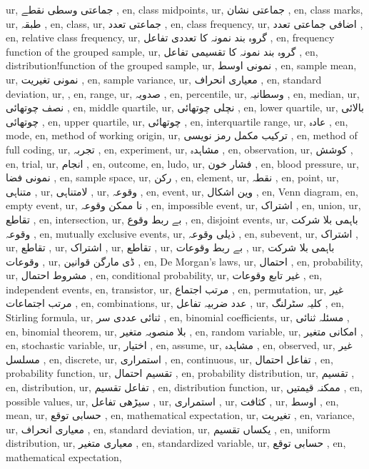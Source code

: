 ur, جماعتی وسطی نقطے ,
en, class midpoints,
ur, جماعتی نشان ,
en, class marks,
ur, طبقہ ,
en, class,
ur, جماعتی تعدد ,
en, class frequency,
ur, اضافی جماعتی تعدد ,
en, relative class frequency,
ur, گروہ بند نمونہ کا تعددی تفاعل ,
en, frequency function of the grouped sample,
ur, گروہ بند نمونہ کا تقسیمی تفاعل ,
en, distribution!function of the grouped sample,
ur, نمونی اوسط ,
en, sample mean,
ur, نمونی تغیریت ,
en, sample variance,
ur, معیاری انحراف ,
en, standard deviation,
ur,  ,
en, range,
ur, صدویہ ,
en, percentile,
ur, وسطانیہ ,
en, median,
ur, نصف چوتھائی ,
en, middle quartile,
ur, نچلی چوتھائی ,
en, lower quartile,
ur, بالائی چوتھائی ,
en, upper quartile,
ur, چوتھائی  ,
en, interquartile range,
ur, عادہ ,
en, mode,
en, method of working origin,
ur, ترکیب مکمل رمز نویسی ,
en, method of full coding,
ur, تجربہ ,
en, experiment,
ur, مشاہدہ ,
en, observation,
ur, کوشش ,
en, trial,
ur, انجام ,
en, outcome,
en, ludo,
ur, فشار خون ,
en, blood pressure,
ur, نمونی فضا ,
en, sample space,
ur, رکن ,
en, element,
ur, نقطہ ,
en, point,
ur, متناہی ,
ur, لامتناہی ,
ur, وقوعہ ,
en, event,
ur, وین اشکال ,
en, Venn diagram,
en, empty event,
ur, نا ممکن وقوعہ ,
en, impossible event,
ur, اشتراک ,
en, union,
ur, تقاطع ,
en, intersection,
ur, بے ربط وقوع ,
en, disjoint events,
ur, باہمی بلا شرکت وقوعہ ,
en, mutually exclusive events,
ur, ذیلی وقوعہ ,
en, subevent,
ur, اشتراک ,
ur, تقاطع ,
ur, اشتراک ,
ur, تقاطع ,
ur, بے ربط وقوعات ,
ur, باہمی بلا شرکت وقوعات ,
ur, ڈی مارگن قوانین ,
en, De Morgan's laws,
ur, احتمال ,
en, probability,
ur, مشروط احتمال ,
en, conditional probability,
ur, غیر تابع وقوعات ,
en, independent events,
en, transistor,
ur, مرتب اجتماع ,
en, permutation,
ur, غیر مرتب اجتماعات ,
en, combinations,
ur, عدد ضربیہ تفاعل ,
ur, کلیہ سٹرلنگ ,
en, Stirling formula,
ur, ثنائی عددی سر ,
en, binomial coefficients,
ur, مسئلہ ثنائی ,
en, binomial theorem,
ur, بلا منصوبہ متغیر ,
en, random variable,
ur, امکانی متغیر ,
en, stochastic variable,
ur, اختیار ,
en, assume,
ur, مشاہدہ ,
en, observed,
ur, غیر مسلسل ,
en, discrete,
ur, استمراری ,
en, continuous,
ur, تفاعل احتمال ,
en, probability function,
ur, تقسیم احتمال ,
en, probability distribution,
ur, تقسیم ,
en, distribution,
ur, تفاعل تقسیم ,
en, distribution function,
ur, ممکنہ قیمتیں ,
en, possible values,
ur, سیڑھی تفاعل ,
ur, استمراری ,
ur, کثافت ,
ur, اوسط ,
en, mean,
ur, حسابی توقع ,
en, mathematical expectation,
ur, تغیریت ,
en, variance,
ur, معیاری انحراف ,
en, standard deviation,
ur, یکساں تقسیم ,
en, uniform distribution,
ur, معیاری متغیر ,
en, standardized variable,
ur, حسابی توقع ,
en, mathematical expectation,
